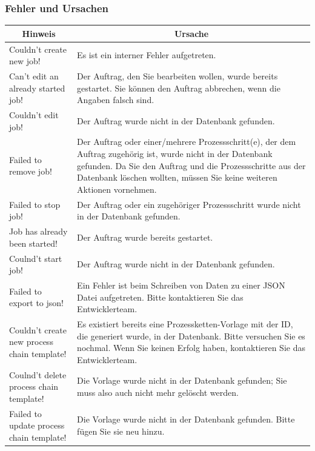 \documentclass[enabledeprecatedfontcommands,fontsize=12pt,paper=a4,twoside]{scrartcl}
\begin{document}
\subsubsection{Fehler und Ursachen}
\begin{longtable}[c]{|p{5cm}|p{10cm}|}
\hline
\multicolumn{1}{|c|}{\textbf{Hinweis}}                          & \multicolumn{1}{c|}{\textbf{Ursache}}                                                                                                                                                                                                               \\ \hline
\endhead
Couldn't create new job! &Es ist ein interner Fehler aufgetreten. \\ \hline
Can't edit an already started job! & Der Auftrag, den Sie bearbeiten wollen, wurde bereits gestartet. Sie können den Auftrag abbrechen, wenn die Angaben falsch sind. \\ \hline
Couldn't edit job! & Der Auftrag wurde nicht in der Datenbank gefunden. \\ \hline
Failed to remove job! & Der Auftrag oder einer/mehrere Prozessschritt(e), der dem Auftrag zugehörig ist, wurde nicht in der Datenbank gefunden. Da Sie den Auftrag und die Prozessschritte aus der Datenbank löschen wollten, müssen Sie keine weiteren Aktionen vornehmen. \\ \hline
Failed to stop job!  & Der Auftrag oder ein zugehöriger Prozessschritt wurde nicht in der Datenbank gefunden.  \\ \hline
Job has already been started!  & Der Auftrag wurde bereits gestartet. \\ \hline
Coulnd't start job! & Der Auftrag wurde nicht in der Datenbank gefunden.\\ \hline
Failed to export to json! & Ein Fehler ist beim Schreiben von Daten zu einer JSON Datei aufgetreten. Bitte kontaktieren Sie das Entwicklerteam.  \\ \hline
Couldn't create new process chain template! & Es existiert bereits eine Prozessketten-Vorlage mit der ID, die generiert wurde, in der Datenbank. Bitte versuchen Sie es nochmal. Wenn Sie keinen Erfolg haben, kontaktieren Sie das Entwicklerteam. \\ \hline
Coulnd't delete process chain template! & Die Vorlage wurde nicht in der Datenbank gefunden; Sie muss also auch nicht mehr gelöscht werden. \\ \hline
Failed to update process chain template! & Die Vorlage wurde nicht in der Datenbank gefunden. Bitte fügen Sie sie neu hinzu. \\ \hline

\end{longtable}
\end{document}

